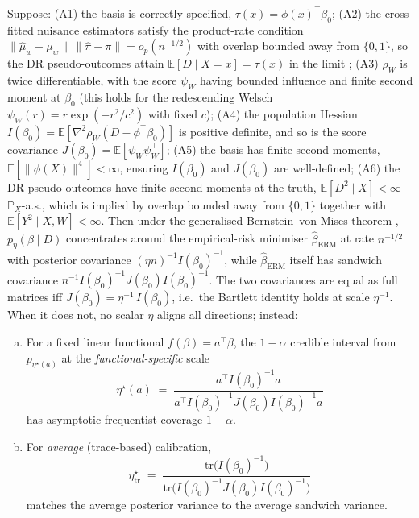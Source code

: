 \begin{proposition}
\label{prop:welsch_calibration}
Suppose:
(A1) the basis is correctly specified,
$\tau(x) = \phi(x)^\top \beta_0$;
(A2) the cross-fitted nuisance estimators satisfy the
product-rate condition $\|\hat{\mu}_w - \mu_w\|\,
\|\hat{\pi} - \pi\| = o_p(n^{-1/2})$ with overlap bounded away
from $\{0,1\}$, so the DR pseudo-outcomes attain
$\mathbb{E}[D \mid X = x] = \tau(x)$ in the limit
\citep{kennedy2020optimal};
(A3) $\rho_W$ is twice differentiable, with the score
$\psi_W$ having bounded influence and finite second moment at
$\beta_0$ (this holds for the redescending Welsch $\psi_W(r)
= r\exp(-r^2/c^2)$ with fixed $c$);
(A4) the population Hessian
$I(\beta_0) = \mathbb{E}[\nabla^2 \rho_W(D - \phi^\top \beta_0)]$
is positive definite, and so is the score covariance
$J(\beta_0) = \mathbb{E}[\psi_W \psi_W^\top]$;
(A5) the basis has finite second moments,
$\mathbb{E}[\|\phi(X)\|^4] < \infty$, ensuring $I(\beta_0)$ and
$J(\beta_0)$ are well-defined; (A6) the DR pseudo-outcomes have
finite second moments at the truth, $\mathbb{E}[D^2 \mid X] < \infty$
$\mathbb{P}_X$-a.s., which is implied by overlap bounded away from
$\{0, 1\}$ together with $\mathbb{E}[Y^2 \mid X, W] < \infty$.
Then under the generalised Bernstein--von Mises theorem
\citep{kleijn2012bernstein}, $p_\eta(\beta \mid D)$ concentrates
around the empirical-risk minimiser $\hat\beta_\mathrm{ERM}$ at
rate $n^{-1/2}$ with posterior covariance $(\eta n)^{-1}
I(\beta_0)^{-1}$, while $\hat\beta_\mathrm{ERM}$ itself has
sandwich covariance $n^{-1} I(\beta_0)^{-1} J(\beta_0)
I(\beta_0)^{-1}$. The two covariances are equal as full matrices
iff $J(\beta_0) = \eta^{-1}\, I(\beta_0)$, i.e.\ the Bartlett
identity holds at scale $\eta^{-1}$. When it does not, no scalar
$\eta$ aligns all directions; instead:

\begin{enumerate}[(a)]
\item For a fixed linear functional $f(\beta) = a^\top \beta$, the
$1 - \alpha$ credible interval from $p_{\eta^\star(a)}$ at the
\emph{functional-specific} scale
\begin{equation}
  \eta^\star(a) \;=\;
  \frac{a^\top I(\beta_0)^{-1} a}
       {a^\top I(\beta_0)^{-1} J(\beta_0) I(\beta_0)^{-1} a}
  \label{eq:eta_a}
\end{equation}
has asymptotic frequentist coverage $1 - \alpha$.
\item For \emph{average} (trace-based) calibration,
\begin{equation}
  \eta^\star_{\mathrm{tr}} \;=\;
  \frac{\mathrm{tr}\!\big(I(\beta_0)^{-1}\big)}
       {\mathrm{tr}\!\big(I(\beta_0)^{-1} J(\beta_0)
                          I(\beta_0)^{-1}\big)}
  \label{eq:eta_tr}
\end{equation}
matches the average posterior variance to the average sandwich
variance.
\end{enumerate}
\end{proposition}

